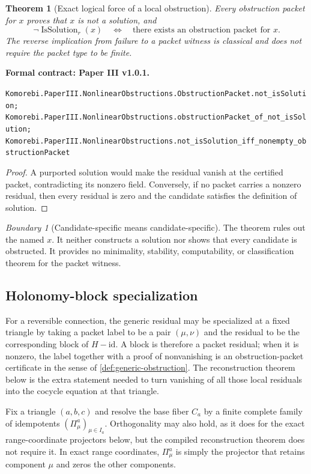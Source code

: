 \documentclass[11pt,a4paper]{article}
\newtheorem{theorem}{Theorem}[section]
\theoremstyle{plain}
\theoremstyle{definition}
\theoremstyle{remark}
\newtheorem{boundary}[boundary]{Boundary}
\newcommand{\id}{\mathrm{id}}
\newcommand{\leanname}[1]{\nolinkurl{#1}}
\newcommand{\statusleanthree}[1]{\par\smallskip\noindent\begin{minipage}{\linewidth}{\color{leanblue}\textbf{Formal contract: Paper III v1.0.1.}}\par\begingroup\small\raggedright\leanname{#1}\par\endgroup\end{minipage}\par\smallskip}
\begin{document}
\begin{theorem}[Exact logical force of a local obstruction]
\label{thm:generic-obstruction}
Every obstruction packet for $x$ proves that $x$ is not a solution, and
\[
\neg\operatorname{IsSolution}_r(x)
\quad\Longleftrightarrow\quad
\text{there exists an obstruction packet for }x.
\]
The reverse implication from failure to a packet witness is classical and
does not require the packet type to be finite.
\end{theorem}
\statusleanthree{Komorebi.PaperIII.NonlinearObstructions.ObstructionPacket.not_isSolution; Komorebi.PaperIII.NonlinearObstructions.obstructionPacket_of_not_isSolution; Komorebi.PaperIII.NonlinearObstructions.not_isSolution_iff_nonempty_obstructionPacket}

\begin{proof}
A purported solution would make the residual vanish at the certified packet,
contradicting its nonzero field.  Conversely, if no packet carries a nonzero
residual, then every residual is zero and the candidate satisfies the
definition of solution.
\end{proof}

\begin{boundary}[Candidate-specific means candidate-specific]
The theorem rules out the named $x$.  It neither constructs a solution nor
shows that every candidate is obstructed.  It provides no minimality,
stability, computability, or classification theorem for the packet witness.
\end{boundary}

\subsection{Holonomy-block specialization}

For a reversible connection, the generic residual may be specialized at a
fixed triangle by taking a packet label to be a pair $(\mu,\nu)$ and the
residual to be the corresponding block of $H-\id$.  A block is therefore a
packet residual; when it is nonzero, the label together with a proof of
nonvanishing is an obstruction-packet certificate in the sense of
\cref{def:generic-obstruction}.  The reconstruction theorem below is the extra
statement needed to turn vanishing of all those local residuals into the
cocycle equation at that triangle.

Fix a triangle $(a,b,c)$ and resolve the base fiber $C_a$ by a finite complete
family of idempotents $(\Pi^a_\mu)_{\mu\in I_a}$.  Orthogonality may also hold,
as it does for the exact range-coordinate projectors below, but the compiled
reconstruction theorem does not require it.  In exact range coordinates,
$\Pi^a_\mu$ is simply the projector that retains component $\mu$ and zeros
the other components.
\end{document}
